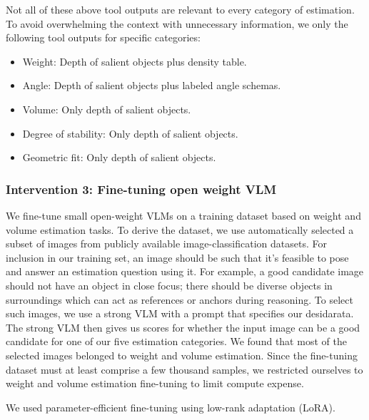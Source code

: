 Not all of these above tool outputs are relevant to every category of estimation. To avoid overwhelming the context with unnecessary information, we only the following tool outputs for specific categories:

\begin{itemize}
\item Weight: Depth of salient objects plus density table.
\item Angle: Depth of salient objects plus labeled angle schemas.
\item Volume: Only depth of salient objects.
\item Degree of stability: Only depth of salient objects.
\item Geometric fit: Only depth of salient objects.
\end{itemize}

\subsubsection{Intervention 3: Fine-tuning open weight VLM}
We fine-tune small open-weight VLMs on a training dataset based on weight and volume estimation tasks. To derive the dataset, we use automatically selected a subset of images from publicly available image-classification datasets. For inclusion in our training set, an image should be such that it's feasible to pose and answer an estimation question using it. For example, a good candidate image should not have an object in close focus; there should be diverse objects in surroundings which can act as references or anchors during reasoning. To select such images, we use a strong VLM with a prompt that specifies our desidarata. The strong VLM then gives us scores for whether the input image can be a good candidate for one of our five estimation categories. We found that most of the selected images belonged to weight and volume estimation. Since the fine-tuning dataset must at least comprise a few thousand samples, we restricted ourselves to weight and volume estimation fine-tuning to limit compute expense.

We used parameter-efficient fine-tuning using low-rank adaptation (LoRA).
